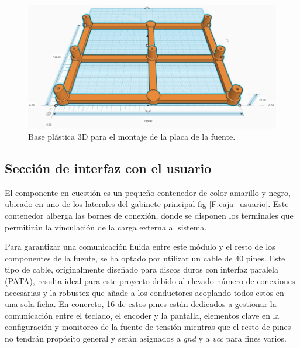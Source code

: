 \begin{figure}[H]
    \centering
    \includegraphics[scale=0.4]{./imagenes/3d_base.jpg}
    \caption{Base plástica 3D para el montaje de la placa de la fuente.}
    \label{F:base3d_fuente}
\end{figure}

\subsection{Sección de interfaz con el usuario}
El componente en cuestión es un pequeño contenedor de color amarillo y negro, ubicado en uno de los laterales del gabinete principal fig \ref{F:caja_usuario}. Este contenedor alberga las bornes de conexión, donde se disponen los terminales que permitirán la vinculación de la carga externa al sistema. \par
Para garantizar una comunicación fluida entre este módulo y el resto de los componentes de la fuente, se ha optado por utilizar un cable de 40 pines. Este tipo de cable, originalmente diseñado para discos duros con interfaz paralela (PATA), resulta ideal para este proyecto debido al elevado número de conexiones necesarias y la robustez que añade a los conductores acoplando todos estos en una sola ficha. En concreto, 16 de estos pines están dedicados a gestionar la comunicación entre el teclado, el encoder y la pantalla, elementos clave en la configuración y monitoreo de la fuente de tensión mientras que el resto de pines no tendrán propósito general y serán asignados a \textit{gnd} y a \textit{vcc} para fines varios. \par

